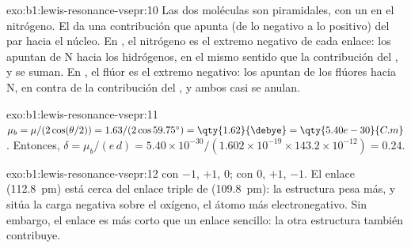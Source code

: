 \begin{solution}{exo:b1:lewis-resonance-vsepr:10}
Las dos moléculas son piramidales, con un  en el
nitrógeno. El  da una contribución que apunta (de lo
negativo a lo positivo) del par hacia el núcleo. En , el
nitrógeno es el extremo negativo de cada enlace: los 
apuntan de N hacia los hidrógenos, en el mismo sentido que la
contribución del , y se suman. En , el flúor es
el extremo negativo: los  apuntan de los flúores hacia
N, en contra de la contribución del , y ambos casi se
anulan.
\end{solution}

\begin{solution}{exo:b1:lewis-resonance-vsepr:11}
$\mu_b = \mu/(2\cos(\theta/2)) = 1.63/(2\cos 59.75^\circ) =
\qty{1.62}{\debye} = \qty{5.40e-30}{C.m}$. Entonces, $\delta = \mu_b/(e\,d) =
5.40 \times 10^{-30}/(1.602 \times 10^{-19} \times 143.2 \times 10^{-12})
= 0.24$.
\end{solution}

\begin{solution}{exo:b1:lewis-resonance-vsepr:12}
 con  $-1$, $+1$, $0$;  con $0$,
$+1$, $-1$. El enlace  (\qty{112.8}{pm}) está cerca del enlace
triple de  (\qty{109.8}{pm}): la estructura  pesa más, y
sitúa la carga negativa sobre el oxígeno, el átomo más electronegativo.
Sin embargo, el enlace  es más corto que un enlace sencillo: la
otra estructura también contribuye.
\end{solution}

